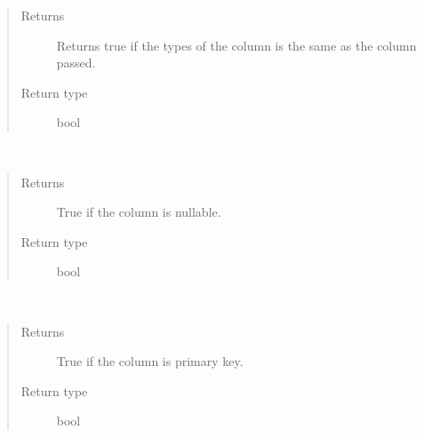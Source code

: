 \documentclass[letterpaper,10pt,english]{sphinxmanual}
\begin{document}
\begin{fulllineitems}
\begin{fulllineitems}
\begin{quote}
\begin{description}
\item[{Returns}] \leavevmode
\sphinxAtStartPar
Returns true if the types of the column is the same
as the column passed.

\item[{Return type}] \leavevmode
\sphinxAtStartPar
bool

\end{description}\end{quote}

\end{fulllineitems}


\begin{fulllineitems}
\label{\detokenize{model:simple_sql.model.column.Column.is_nullable}}~\begin{quote}\begin{description}
\item[{Returns}] \leavevmode
\sphinxAtStartPar
True if the column is nullable.

\item[{Return type}] \leavevmode
\sphinxAtStartPar
bool

\end{description}\end{quote}

\end{fulllineitems}


\begin{fulllineitems}
\label{\detokenize{model:simple_sql.model.column.Column.is_primary_key}}~\begin{quote}\begin{description}
\item[{Returns}] \leavevmode
\sphinxAtStartPar
True if the column is primary key.

\item[{Return type}] \leavevmode
\sphinxAtStartPar
bool

\end{description}\end{quote}


\end{fulllineitems}
\end{fulllineitems}
\end{document}
